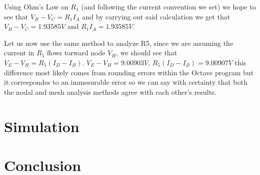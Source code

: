 \documentclass[11pt]{article}
\begin{document}
Using Ohm's Law on $R_1$ (and following the current convention we set) we hope to see that $V_B - V_C = R_1I_A$ and by carrying out said calculation we get that $V_B - V_C = 1.93585V$ and $R_1I_A = 1.93585V$. \vspace{12pt}

Let us now use the same method to analyze R5, since we are assuming the current in $R_5$ flows torward node $V_H$, we should see that $V_E - V_H = R_5(I_D - I_B)$. $V_E - V_H = 9.00903V$, $R_5(I_D - I_B) = 9.00907V$ this difference most likely comes from rounding errors within the Octave program but it correspondes to an immesurable error so we can say with certainty that both the nodal and mesh analysis methods agree with each other's results.

\pagebreak
\section{Simulation}


\pagebreak
\section{Conclusion}

\end{document}
